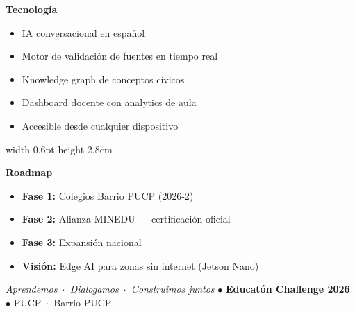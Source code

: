 \documentclass[a4paper, 10pt]{article}
\begin{document}
\vspace{2pt}

\begin{tcolorbox}[
  enhanced,
  colback=ylightbg,
  colframe=ypurple!35,
  arc=3mm,
  boxrule=0.8pt,
  left=8pt, right=8pt, top=5pt, bottom=5pt
]
\begin{minipage}[t]{0.465\textwidth}
  {\color{ypurple}\fontsize{10}{12}\selectfont\textbf{Tecnolog\'{i}a}}\\[5pt]
  {\color{ygray}\footnotesize
  \begin{itemize}[leftmargin=10pt, itemsep=0pt, topsep=0pt, parsep=0pt]
    \item IA conversacional en espa\~{n}ol
    \item Motor de validaci\'{o}n de fuentes en tiempo real
    \item Knowledge graph de conceptos c\'{i}vicos
    \item Dashboard docente con analytics de aula
    \item Accesible desde cualquier dispositivo
  \end{itemize}}
\end{minipage}%
\hfill%
\textcolor{ypurple!20}{\vrule width 0.6pt height 2.8cm}%
\hfill%
\begin{minipage}[t]{0.465\textwidth}
  {\color{ypurple}\fontsize{10}{12}\selectfont\textbf{Roadmap}}\\[5pt]
  {\color{ygray}\footnotesize
  \begin{itemize}[leftmargin=10pt, itemsep=0pt, topsep=0pt, parsep=0pt]
    \item \textbf{Fase 1:} Colegios Barrio PUCP (2026-2)
    \item \textbf{Fase 2:} Alianza MINEDU --- certificaci\'{o}n oficial
    \item \textbf{Fase 3:} Expansi\'{o}n nacional
    \item \textbf{Visi\'{o}n:} Edge AI para zonas sin internet (Jetson Nano)
  \end{itemize}}
\end{minipage}
\end{tcolorbox}

\vspace{2pt}

\begin{center}
{\color{ygray}\fontsize{8.5}{10}\selectfont
\textit{Aprendemos\ $\cdot$\ Dialogamos\ $\cdot$\ Construimos juntos}
\quad $\bullet$ \quad
{\color{yblue}\textbf{Educat\'{o}n Challenge 2026}}
\quad $\bullet$ \quad
PUCP\ $\cdot$\ Barrio PUCP}
\end{center}
\end{document}
